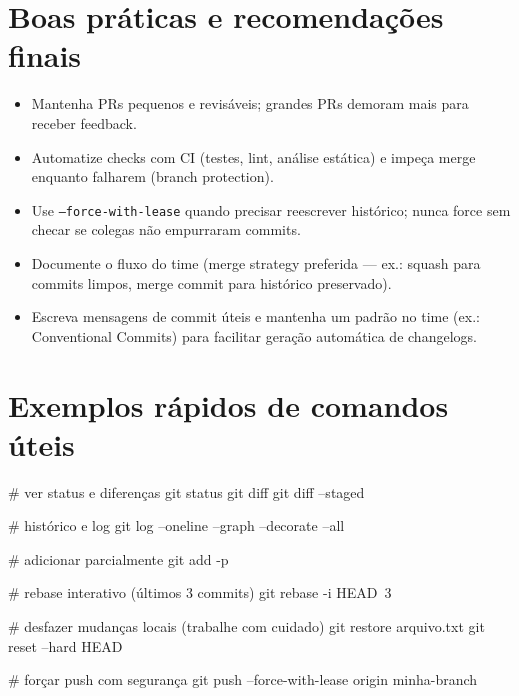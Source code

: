 \section{Boas práticas e recomendações finais}
\begin{itemize}
  \item Mantenha PRs pequenos e revisáveis; grandes PRs demoram mais para receber feedback.  
  \item Automatize checks com CI (testes, lint, análise estática) e impeça merge enquanto falharem (branch protection).  
  \item Use \texttt{--force-with-lease} quando precisar reescrever histórico; nunca force sem checar se colegas não empurraram commits.  
  \item Documente o fluxo do time (merge strategy preferida — ex.: squash para commits limpos, merge commit para histórico preservado).  
  \item Escreva mensagens de commit úteis e mantenha um padrão no time (ex.: Conventional Commits) para facilitar geração automática de changelogs.
\end{itemize}

\section{Exemplos rápidos de comandos úteis}
\begin{bashcode}
# ver status e diferenças
git status
git diff
git diff --staged

# histórico e log
git log --oneline --graph --decorate --all

# adicionar parcialmente
git add -p

# rebase interativo (últimos 3 commits)
git rebase -i HEAD~3

# desfazer mudanças locais (trabalhe com cuidado)
git restore arquivo.txt
git reset --hard HEAD

# forçar push com segurança
git push --force-with-lease origin minha-branch
\end{bashcode}

